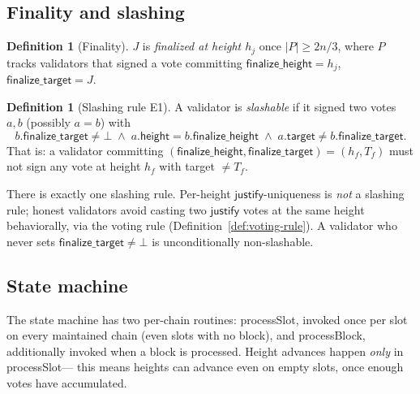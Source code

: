 \documentclass{article}
\newcommand{\target}{\mathsf{target}}
\newcommand{\height}{\mathsf{height}}
\newcommand{\just}{\ensuremath{\mathsf{justify}}\xspace}
\newcommand{\finalizeHeight}{\mathsf{finalize\_height}}
\newcommand{\finalizeTarget}{\mathsf{finalize\_target}}
\newcommand{\processSlot}{\textsf{processSlot}\xspace}
\newcommand{\processBlock}{\textsf{processBlock}\xspace}
\theoremstyle{plain}
\theoremstyle{definition}
\newtheorem{definition}[theorem]{Definition}
\theoremstyle{remark}
\begin{document}
\subsection{Finality and slashing}

\begin{definition}[Finality]\label{def:finality}
$J$ is \emph{finalized at height $h_j$} once $|P| \geq 2n/3$, where $P$ tracks validators that signed a vote committing $\finalizeHeight = h_j$, $\finalizeTarget = J$.
\end{definition}

\begin{definition}[Slashing rule E1]\label{def:slashing}
A validator is \emph{slashable} if it signed two votes $a, b$ (possibly $a = b$) with
\[
  b.\finalizeTarget \neq \bot \;\wedge\; a.\height = b.\finalizeHeight \;\wedge\; a.\target \neq b.\finalizeTarget.
\]
That is: a validator committing $(\finalizeHeight, \finalizeTarget) = (h_f, T_f)$ must not sign any vote at height $h_f$ with target $\neq T_f$.
\end{definition}

\begin{intuition}
There is exactly one slashing rule. Per-height \just{}-uniqueness is \emph{not} a slashing rule; honest validators avoid casting two \just{} votes at the same height behaviorally, via the voting rule (Definition~\ref{def:voting-rule}). A validator who never sets $\finalizeTarget \neq \bot$ is unconditionally non-slashable.
\end{intuition}

\subsection{State machine}\label{sec:state-machine}

The state machine has two per-chain routines: \processSlot, invoked once per slot on every maintained chain (even slots with no block), and \processBlock, additionally invoked when a block is processed. Height advances happen \emph{only} in \processSlot --- this means heights can advance even on empty slots, once enough votes have accumulated.
\end{document}
